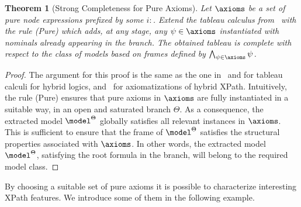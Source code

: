 \documentclass[10pt,a4paper]{amsart}
\newtheorem{thm}{Theorem}[section]
\theoremstyle{definition}
\theoremstyle{remark}
\begin{document}
\begin{thm}[Strong Completeness for Pure Axioms]\label{th:strong}
    \label{th:pure-completeness}
    Let $\axioms$ be a set of pure node expressions prefixed by some $i{:}$.
    Extend the tableau calculus from~ with the rule (Pure) which adds, at any stage, any $\psi\in\axioms$ instantiated with nominals already appearing in the branch. The obtained tableau is complete with respect to the class of models based on frames defined by $\bigwedge_{\psi\in\axioms} \psi$.
\end{thm}



\begin{proof}
 The argument for this proof is the same as the one in~\cite[Th.~7.2]{Blackburn00} and \cite[Prop.~3.2]{Blackburn2002BeyondPA} for tableau calculi for hybrid logics, and~\cite[Th.~3.23]{ArecesF21} for axiomatizations of hybrid XPath.  Intuitively, the rule (Pure) ensures that pure axioms in $\axioms$ are fully instantiated in a suitable way, in an open and saturated branch $\Theta$. As a consequence, the extracted model $\model^\Theta$ globally satisfies all relevant instances in $\axioms$. This is sufficient to ensure that the frame of $\model^\Theta$ satisfies the structural properties associated with $\axioms$. In 
 other words, the extracted model $\model^\Theta$, satisfying the root formula in the branch, will belong to the required model class. 
\end{proof}


By choosing a suitable set of pure axioms it is possible to characterize interesting XPath features. 
We introduce some of them in the following example.
\end{document}

